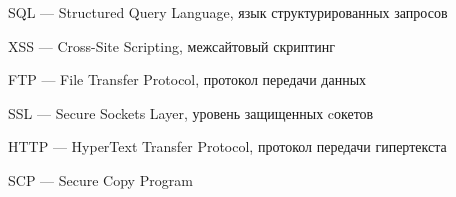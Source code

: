 \hypertarget{sql}{SQL --- Structured Query Language, язык структурированных запросов}

\hypertarget{xss}{XSS --- Cross-Site Scripting, межсайтовый скриптинг}

\hypertarget{ftp}{FTP --- File Transfer Protocol, протокол передачи данных}

\hypertarget{ssl}{SSL --- Secure Sockets Layer, уровень защищенных cокетов}

\clearpage

\hypertarget{http}{HTTP --- HyperText Transfer Protocol, протокол передачи гипертекста}

\hypertarget{scp}{SCP --- Secure Copy Program}

\clearpage
